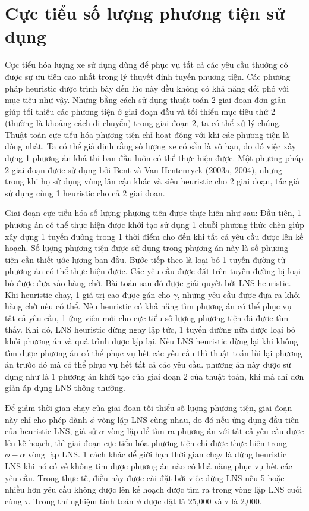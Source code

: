 \section{Cực tiểu số lượng phương tiện sử dụng}
Cực tiểu hóa lượng xe sử dụng dùng để phục vụ tất cả các yêu cầu thường có được sự ưu tiên cao nhất trong lý thuyết định tuyến phương tiện. Các phương pháp heuristic được trình bày đến lúc này đều không có khả năng đối phó với mục tiêu như vậy. Nhưng bằng cách sử dụng thuật toán 2 giai đoạn đơn giản giúp tối thiểu các phương tiện ở giai đoạn đầu và tối thiểu mục tiêu thứ 2 (thường là khoảng cách di chuyển) trong giai đoạn 2, ta có thể xử lý chúng. Thuật toán cực tiểu hóa phương tiện chỉ hoạt động với khi các phương tiện là đồng nhất. Ta có thể giả định rằng số lượng xe có sẵn là vô hạn, do đó việc xây dựng 1 phương án khả thi ban đầu luôn có thể thực hiện được. Một phương pháp 2 giai đoạn được sử dụng bởi Bent và Van Hentenryck (2003a, 2004), nhưng trong khi họ sử dụng vùng lân cận khác và siêu heuristic cho 2 giai đoạn, tác giả sử dụng cùng 1 heuristic cho cả 2 giai đoạn.

Giai đoạn cực tiểu hóa số lượng phương tiện được thực hiện như sau: Đầu tiên, 1 phương án có thể thực hiện được khởi tạo sử dụng 1 chuỗi phương thức chèn giúp xây dựng 1 tuyến đường trong 1 thời điểm cho đến khi tất cả yêu cầu được lên kế hoạch. Số lượng phương tiện được sử dụng trong phương án này là số  phương tiện cần thiết ước lượng ban đầu. Bước tiếp theo là loại bỏ 1 tuyến đường từ phương án có thể thực hiện được. Các yêu cầu được đặt trên tuyến đường bị loại bỏ được đưa vào hàng chờ. Bài toán sau đó được giải quyết bởi LNS heuristic. Khi heuristic chạy, 1 giá trị cao được gán cho $\gamma$, những yêu cầu được đưa ra khỏi hàng chờ nếu có thể. Nếu heuristic có khả năng tìm phương án có thể phục vụ tất cả yêu cầu, 1 ứng viên mới cho cực tiểu số lượng phương tiện đã được tìm thấy. Khi đó, LNS heuristic dừng ngay lập tức, 1 tuyến đường nữa được loại bỏ khỏi phương án và quá trình được lặp lại. Nếu LNS heuristic dừng lại khi không tìm được phương án có thể phục vụ hết các yêu cầu thì thuật toán lùi lại phương án trước đó mà có thể phục vụ hết tất cả các yêu cầu. phương án này được sử dụng như là 1 phương án khởi tạo của giai đoạn 2 của thuật toán, khi mà chỉ đơn giản áp dụng LNS thông thường.

Để giảm thời gian chạy của giai đoạn tối thiểu số lượng phương tiện, giai đoạn này chỉ cho phép dành $\phi$ vòng lặp LNS cùng nhau, do đó nếu ứng dụng đầu tiên của heuristic LNS, giả sử $\alpha$ vòng lặp để tìm ra phương án với tất cả yêu cầu được lên kế hoạch, thì giai đoạn cực tiểu hóa phương tiện chỉ được thực hiện trong $\phi - \alpha$ vòng lặp LNS. 1 cách khác để giới hạn thời gian chạy là dừng heuristic LNS khi nó có vẻ không tìm được phương án nào có khả năng phục vụ hết các yêu cầu. Trong thực tế, điều này được cài đặt bởi việc dừng LNS nếu 5 hoặc nhiều hơn yêu cầu không được lên kế hoạch được tìm ra trong vòng lặp LNS cuối cùng $\tau$. Trong thí nghiệm tính toán $\phi$ được đặt là 25,000 và $\tau$ là 2,000.
